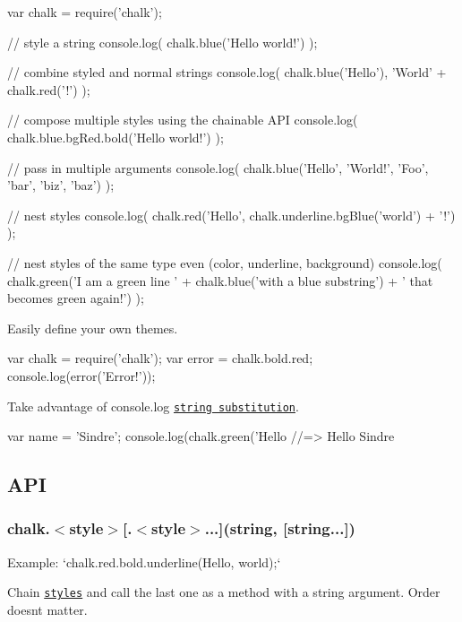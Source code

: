 \begin{DoxyCode}
var chalk = require('chalk');

// style a string
console.log(  chalk.blue('Hello world!')  );

// combine styled and normal strings
console.log(  chalk.blue('Hello'), 'World' + chalk.red('!')  );

// compose multiple styles using the chainable API
console.log(  chalk.blue.bgRed.bold('Hello world!')  );

// pass in multiple arguments
console.log(  chalk.blue('Hello', 'World!', 'Foo', 'bar', 'biz', 'baz')  );

// nest styles
console.log(  chalk.red('Hello', chalk.underline.bgBlue('world') + '!')  );

// nest styles of the same type even (color, underline, background)
console.log(  chalk.green('I am a green line ' + chalk.blue('with a blue substring') + ' that becomes green
       again!')  );
\end{DoxyCode}


Easily define your own themes.


\begin{DoxyCode}
var chalk = require('chalk');
var error = chalk.bold.red;
console.log(error('Error!'));
\end{DoxyCode}


Take advantage of console.\+log \href{http://nodejs.org/docs/latest/api/console.html#console_console_log_data}{\tt string substitution}.


\begin{DoxyCode}
var name = 'Sindre';
console.log(chalk.green('Hello %
//=> Hello Sindre
\end{DoxyCode}


\subsection*{A\+PI}

\subsubsection*{chalk.{\ttfamily $<$style$>$\mbox{[}.$<$style$>$...\mbox{]}(string, \mbox{[}string...\mbox{]})}}

Example\+: `chalk.red.\+bold.\+underline(\textquotesingle{}Hello\textquotesingle{}, \textquotesingle{}world\textquotesingle{});`

Chain \href{#styles}{\tt styles} and call the last one as a method with a string argument. Order doesn\textquotesingle{}t matter.

